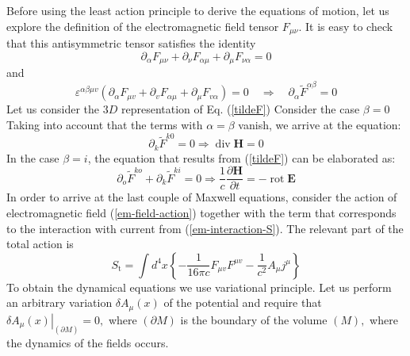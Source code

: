 Before using the least action principle to derive the equations of motion, let us explore the definition of the electromagnetic field tensor $F_{\mu\nu}$. It is easy to check that this antisymmetric tensor satisfies the identity
\begin{equation}
\partial_{\alpha} F_{\mu \nu}+\partial_{\nu} F_{\alpha \mu}+\partial_{\mu} F_{\nu \alpha}=0
\end{equation}
and
\begin{equation}
\varepsilon^{\alpha \beta \mu v}\left(\partial_{\alpha} F_{\mu v}+\partial_{v} F_{\alpha \mu}+\partial_{\mu} F_{v \alpha}\right)=0 \quad \Longrightarrow \quad \partial_{\alpha} \tilde{F}^{\alpha \beta}=0
\label{tildeF}
\end{equation}
Let us consider the $3 D$ representation of Eq. (\ref{tildeF}) Consider the case $\beta=0$ Taking into account that the terms with $\alpha=\beta$ vanish, we arrive at the equation:
\begin{equation}
\partial_{k} \tilde{F}^{k 0}=0 \Longrightarrow \operatorname{div} \mathbf{H}=0
\end{equation}
In the case $\beta=i$, the equation that results from (\ref{tildeF}) can be elaborated as:
\begin{equation}
\partial_{o} \tilde{F}^{k o}+\partial_{k} \tilde{F}^{k i}=0 \Longrightarrow \frac{1}{c} \frac{\partial \mathbf{H}}{\partial t}=-\operatorname{rot} \mathbf{E}
\end{equation}
In order to arrive at the last couple of Maxwell equations, consider the action of electromagnetic field (\ref{em-field-action}) together with the term that corresponds to the interaction with current from (\ref{em-interaction-S}). The relevant part of the total action is
\begin{equation}
S_{\mathrm{t}}=\int d^{4} x\left\{-\frac{1}{16 \pi c} F_{\mu v} F^{\mu v}-\frac{1}{c^{2}} A_{\mu} j^{\mu}\right\}
\end{equation}
To obtain the dynamical equations we use variational principle. Let us perform an arbitrary variation $\delta A_{\mu}(x)$ of the potential and require that $\left.\delta A_{\mu}(x)\right|_{(\partial M)}=0,$ where $(\partial M)$ is the boundary of the volume $(M),$ where the dynamics of the fields occurs. 

